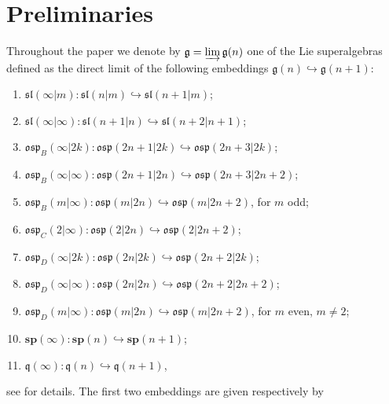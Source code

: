 \documentclass[12pt]{amsart}
\newcommand\g{\mathfrak{g}}
\newcommand\fq{\mathfrak{q}}
\newcommand\fsl{\mathfrak{sl}}
\newcommand\fosp{\mathfrak{osp}}
\newcommand\bsp{\mathbf{sp}}
\theoremstyle{plain}
\theoremstyle{definition}
\numberwithin{equation}{section}
\begin{document}
\section{Preliminaries}\label{sec:prel}

Throughout the paper we denote by $\g = \varinjlim \g(n)$ one of the  Lie superalgebras defined as the direct limit of the following embeddings $\g(n) \hookrightarrow \g(n+1)$:
\begin{enumerate}\label{def:dir.lim.superalg.}
\item \label{def:dir.lim.superalg.A1} $\fsl(\infty|m) : \fsl(n|m)\hookrightarrow \fsl(n+1|m)$;
\item \label{def:dir.lim.superalg.A2} $\fsl(\infty|\infty) : \fsl(n+1|n)\hookrightarrow \fsl(n+2|n+1)$;
\item \label{def:dir.lim.superalg.B1} $\fosp_B(\infty|2k) : \fosp(2n+1|2k)\hookrightarrow \fosp(2n+3|2k)$;
\item \label{def:dir.lim.superalg.B2} $\fosp_B(\infty|\infty) : \fosp(2n+1|2n)\hookrightarrow \fosp(2n+3|2n+2)$;
\item \label{def:dir.lim.superalg.B3} $\fosp_B(m|\infty) : \fosp(m|2n)\hookrightarrow \fosp(m|2n+2)$, for $m$ odd;
\item \label{def:dir.lim.superalg.C} $\fosp_C(2|\infty) : \fosp(2|2n)\hookrightarrow \fosp(2|2n+2)$;
\item \label{def:dir.lim.superalg.D1} $\fosp_D(\infty|2k) : \fosp(2n|2k)\hookrightarrow \fosp(2n+2|2k)$;
\item \label{def:dir.lim.superalg.D2} $\fosp_D(\infty|\infty) : \fosp(2n|2n)\hookrightarrow \fosp(2n+2|2n+2)$;
\item \label{def:dir.lim.superalg.D3} $\fosp_D(m|\infty) : \fosp(m|2n)\hookrightarrow \fosp(m|2n+2)$, for $m$ even, $m\neq 2$;
\item \label{def:dir.lim.superalg.p} $\bsp(\infty) : \bsp(n)\hookrightarrow \bsp(n+1)$;
\item \label{def:dir.lim.superalg.q} $\fq(\infty) : \fq(n)\hookrightarrow \fq(n+1)$,
\end{enumerate}
see \cite{Pen04} for details. The first two embeddings are given respectively by
\end{document}
